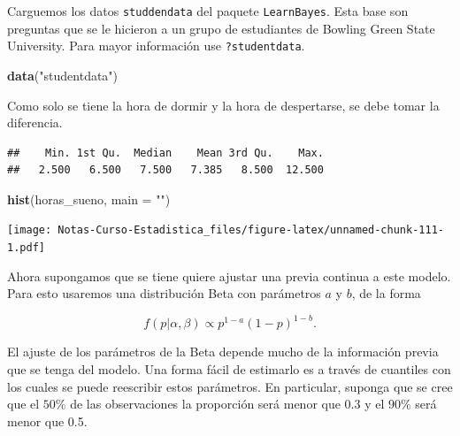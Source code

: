 \documentclass[
  12pt,
]{book}
\newenvironment{Shaded}{\begin{snugshade}}{\end{snugshade}}
\newcommand{\DataTypeTok}[1]{\textcolor[rgb]{0.13,0.29,0.53}{#1}}
\newcommand{\KeywordTok}[1]{\textcolor[rgb]{0.13,0.29,0.53}{\textbf{#1}}}
\newcommand{\NormalTok}[1]{#1}
\newcommand{\OperatorTok}[1]{\textcolor[rgb]{0.81,0.36,0.00}{\textbf{#1}}}
\newcommand{\StringTok}[1]{\textcolor[rgb]{0.31,0.60,0.02}{#1}}
\theoremstyle{definition}
\theoremstyle{definition}
\theoremstyle{definition}
\theoremstyle{remark}
\begin{document}
Carguemos los datos \texttt{studdendata} del paquete \texttt{LearnBayes}. Esta base
son preguntas que se le hicieron a un grupo de estudiantes de Bowling
Green State University. Para mayor información use \texttt{?studentdata}.

\begin{Shaded}
\begin{Highlighting}[]
\KeywordTok{data}\NormalTok{(}\StringTok{"studentdata"}\NormalTok{)}
\end{Highlighting}
\end{Shaded}

Como solo se tiene la hora de dormir y la hora de despertarse, se debe tomar la diferencia.

\begin{Shaded}
\end{Shaded}

\begin{verbatim}
##    Min. 1st Qu.  Median    Mean 3rd Qu.    Max. 
##   2.500   6.500   7.500   7.385   8.500  12.500
\end{verbatim}

\begin{Shaded}
\begin{Highlighting}[]
\KeywordTok{hist}\NormalTok{(horas_sueno, }\DataTypeTok{main =} \StringTok{""}\NormalTok{)}
\end{Highlighting}
\end{Shaded}

\texttt{[image: Notas-Curso-Estadistica\_files/figure-latex/unnamed-chunk-111-1.pdf]}

Ahora supongamos que se tiene quiere ajustar una previa continua a este modelo. Para esto usaremos una distribución Beta con parámetros \(a\) y \(b\), de la forma

\[
    f(p\vert \alpha, \beta) \propto p^{1-a} (1-p)^{1-b}.
\]

El ajuste de los parámetros de la Beta depende mucho de la información
previa que se tenga del modelo. Una forma fácil de estimarlo es a
través de cuantiles con los cuales se puede reescribir estos
parámetros. En particular, suponga que se cree que el \(50\%\) de las
observaciones la proporción será menor que 0.3 y el \(90\%\) será menor
que 0.5.
\end{document}
